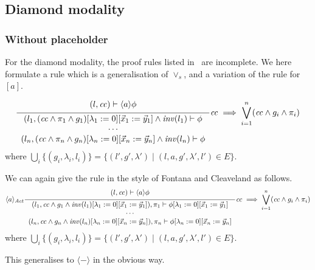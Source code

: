 \documentclass{article}
\newcommand{\proofrule}[3][]{#1 \frac{\raisebox{.7ex}{\normalsize{$#2$}}}
  {\raisebox{-1.0ex}{\normalsize{$#3$}}}}
\newcommand{\placeholder}[1][]{\pi_{#1}}
\newcommand{\loc}{l}
\newcommand{\region}{\mathit{cc}}
\newcommand{\inv}{\mathit{inv}}
\begin{document}
\subsection{Diamond modality}

\subsubsection{Without placeholder}
For the diamond modality, the proof rules listed in~\cite{FC:14report} are incomplete. We here formulate a rule which is a generalisation of $\lor_s$, and a variation of the rule for $[a]$.

\[
\proofrule
{(\loc, \region) \vdash \langle a \rangle \phi}
{
\begin{array}{c}
(\loc_1, (\region \land \placeholder[1] \land g_1)[\lambda_1 := 0][\vec{x}_1 := \vec{y}_1] \land \inv(\loc_1) \vdash \phi \\
\cdots \\
(\loc_n, (\region \land \placeholder[n] \land g_n)[\lambda_n := 0][\vec{x}_n := \vec{y}_n] \land \inv(\loc_n) \vdash \phi
\end{array}
}
\region \implies \bigvee_{i=1}^n (\region \land g_i \land \placeholder[i])
\]
where $\bigcup_i \{ (g_i,\lambda_i,\loc_i) \} = \{ (\loc', g', \lambda') \mid (\loc, a, g', \lambda', \loc') \in E \}$.

We can again give the rule in the style of Fontana and Cleaveland as follows.
\[
\proofrule[{\langle a \rangle_{\mathit{Act}}}]
{(\loc, \region) \vdash \langle a \rangle \phi}
{
\begin{array}{c}
 (\loc_1, \region \land g_1 \land \inv(\loc_1)[\lambda_1 := 0][\vec{x}_1 := \vec{y}_1]), \placeholder[1] \vdash \phi{[\lambda_1 := 0][\vec{x}_1 := \vec{y}_1]} \\
\cdots \\
(\loc_n, \region \land g_n \land \inv(\loc_n)[\lambda_n := 0][\vec{x}_n := \vec{y}_n]), \placeholder[n] \vdash \phi{[\lambda_n := 0][\vec{x}_n := \vec{y}_n]}
\end{array}
}
\region \implies \bigvee_{i=1}^n (\region \land g_i \land \placeholder[i])
\]
where $\bigcup_i \{ (g_i,\lambda_i,\loc_i) \} = \{ (\loc', g', \lambda') \mid (\loc, a, g', \lambda', \loc') \in E \}$.

This generalises to $\langle - \rangle$ in the obvious way.
\end{document}
